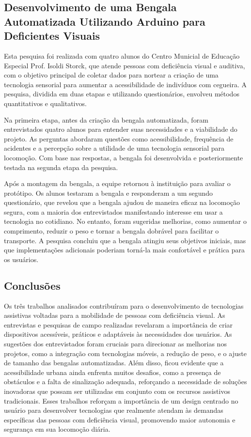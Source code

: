 \subsection{Desenvolvimento de uma Bengala Automatizada Utilizando Arduino para Deficientes
Visuais}

Esta pesquisa foi realizada com quatro alunos do Centro Municial de Educação Especial Prof. Isoldi Storck, que atende pessoas com deficiência visual e auditiva, com o objetivo principal de coletar dados para nortear a criação de uma tecnologia sensorial para aumentar a acessibilidade de indivíduos com cegueira. A pesquisa, dividida em duas etapas e utilizando questionários, envolveu métodos quantitativos e qualitativos.

Na primeira etapa, antes da criação da bengala automatizada, foram entrevistados quatro alunos para entender suas necessidades e a viabilidade do projeto. As perguntas abordaram questões como acessibilidade, frequência de acidentes e a percepção sobre a utilidade de uma tecnologia sensorial para locomoção. Com base nas respostas, a bengala foi desenvolvida e posteriormente testada na segunda etapa da pesquisa.

Após a montagem da bengala, a equipe retornou à instituição para avaliar o protótipo. Os alunos testaram a bengala e responderam a um segundo questionário, que revelou que a bengala ajudou de maneira eficaz na locomoção segura, com a maioria dos entrevistados manifestando interesse em usar a tecnologia no cotidiano. No entanto, foram sugeridas melhorias, como aumentar o comprimento, reduzir o peso e tornar a bengala dobrável para facilitar o transporte. A pesquisa concluiu que a bengala atingiu seus objetivos iniciais, mas que implementações adicionais poderiam torná-la mais confortável e prática para os usuários.

\subsection{Conclusões}
Os três trabalhos analisados contribuíram para o desenvolvimento de tecnologias assistivas voltadas para a mobilidade de pessoas com deficiência visual. As entrevistas e pesquisas de campo realizadas revelaram a importância de criar dispositivos acessíveis, práticos e adaptáveis às necessidades dos usuários. As sugestões dos entrevistados foram cruciais para direcionar as melhorias nos projetos, como a integração com tecnologias móveis, a redução de peso, e o ajuste de tamanho das bengalas automatizadas. Além disso, ficou evidente que a acessibilidade urbana ainda enfrenta muitos desafios, como a presença de obstáculos e a falta de sinalização adequada, reforçando a necessidade de soluções inovadoras que possam ser utilizadas em conjunto com os recursos assistivos tradicionais. Esses trabalhos reforçam a importância de um design centrado no usuário para desenvolver tecnologias que realmente atendam às demandas específicas das pessoas com deficiência visual, promovendo maior autonomia e segurança em sua locomoção diária.

